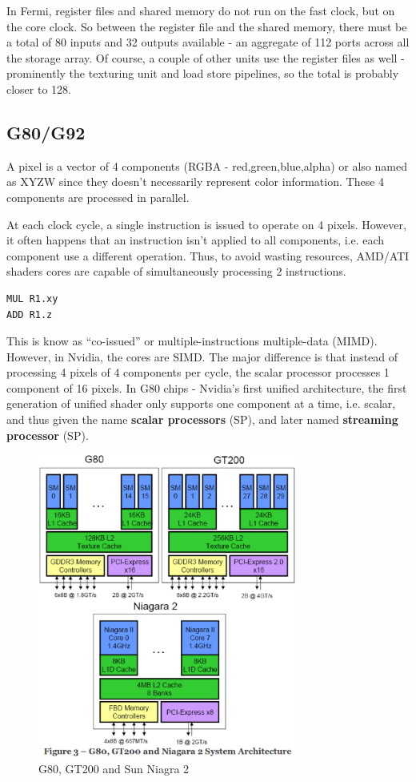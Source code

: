 In Fermi, register files and shared memory do not run on the fast
clock, but on the core clock. So between the register file and the
shared memory, there must be a total of 80 inputs and 32 outputs
available - an aggregate of 112 ports across all the storage array. Of
course, a couple of other units use the register files as well -
prominently the texturing unit and load store pipelines, so the total
is probably closer to 128.


\subsection{G80/G92}
\label{sec:g80g92-architecture}

A pixel is a vector of 4 components (RGBA - red,green,blue,alpha) or
also named as XYZW since they doesn't necessarily represent color
information. These 4 components are processed in parallel.

At each clock cycle, a single instruction is issued to operate on 4 pixels.
However, it often happens that an instruction isn't applied to all components,
i.e. each component use a different operation. Thus, to avoid wasting resources,
AMD/ATI shaders cores are capable of simultaneously processing 2 instructions.
\begin{verbatim}
MUL R1.xy
ADD R1.z
\end{verbatim}
This is know as ``co-issued'' or multiple-instructions multiple-data
(MIMD). However, in Nvidia, the cores are SIMD. The major difference
is that instead of processing 4 pixels of 4 components per cycle, the
scalar processor processes 1 component of 16 pixels. In G80 chips -
Nvidia's first unified architecture, the first generation of unified
shader only supports one component at a time, i.e. scalar, and thus
given the name {\bf scalar processors} (SP), and later named {\bf streaming 
processor} (SP).

\begin{figure}[hbt]
  \centerline{\includegraphics[height=10cm,
    angle=0]{./images/g80_gt200_niagra.eps}}
\caption{G80, GT200 and Sun Niagra 2}
\label{fig:g80_gt200_niagra}
\end{figure}



